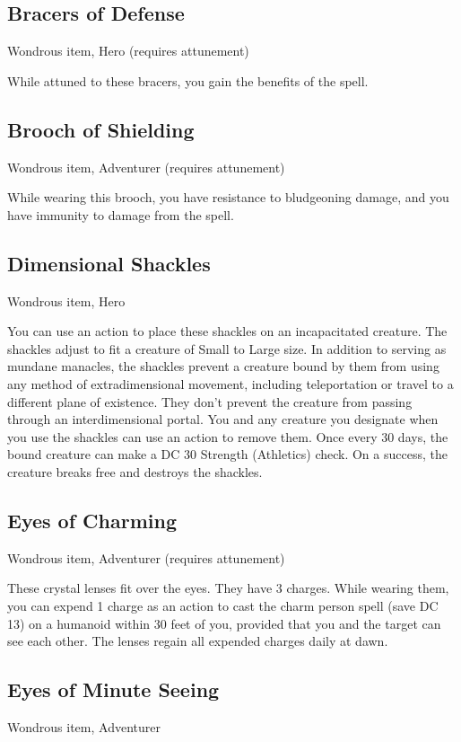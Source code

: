 \subsection{Bracers of Defense}
Wondrous item, Hero (requires attunement)

While attuned to these bracers, you gain the benefits of the  spell.

\subsection{Brooch of Shielding}
Wondrous item, Adventurer (requires attunement)

While wearing this brooch, you have resistance to bludgeoning damage, and you have immunity to damage from the  spell.

\subsection{Dimensional Shackles}
Wondrous item, Hero 

You can use an action to place these shackles on an incapacitated creature. The shackles adjust to fit a creature of Small to Large size. In addition to serving as mundane manacles, the shackles prevent a creature bound by them from using any method of extradimensional movement, including teleportation or travel to a different plane of existence. They don't prevent the creature from passing through an interdimensional portal. You and any creature you designate when you use the shackles can use an action to remove them. Once every 30 days, the bound creature can make a DC 30 Strength (Athletics) check. On a success, the creature breaks free and destroys the shackles.

\subsection{Eyes of Charming}
Wondrous item, Adventurer (requires attunement)

These crystal lenses fit over the eyes. They have 3 charges. While wearing them, you can expend 1 charge as an action to cast the
charm person spell (save DC 13) on a humanoid within 30 feet of you, provided that you and the target can see each other. The lenses regain all expended charges daily at dawn.

\subsection{Eyes of Minute Seeing}
Wondrous item, Adventurer 

